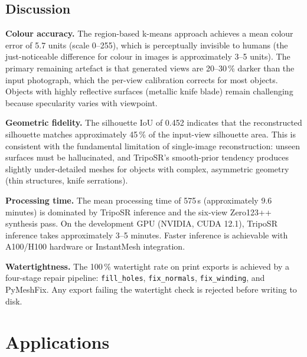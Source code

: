 ﻿\documentclass[conference]{IEEEtran}
\begin{document}
\subsection{Discussion}

\textbf{Colour accuracy.}
The region-based k-means approach achieves a mean colour error of 5.7 units (scale 0--255), which is perceptually
invisible to humans (the just-noticeable difference for colour in images is approximately 3--5 units). The primary
remaining artefact is that generated views are 20--30\,\% darker than the input photograph, which the per-view
calibration corrects for most objects. Objects with highly reflective surfaces (metallic knife blade) remain
challenging because specularity varies with viewpoint.

\textbf{Geometric fidelity.}
The silhouette IoU of 0.452 indicates that the reconstructed silhouette matches approximately 45\,\% of the
input-view silhouette area. This is consistent with the fundamental limitation of single-image reconstruction:
unseen surfaces must be hallucinated, and TripoSR's smooth-prior tendency produces slightly under-detailed
meshes for objects with complex, asymmetric geometry (thin structures, knife serrations).

\textbf{Processing time.}
The mean processing time of 575\,s (approximately 9.6 minutes) is dominated by TripoSR inference and the
six-view Zero123++ synthesis pass. On the development GPU (NVIDIA, CUDA 12.1), TripoSR inference takes
approximately 3--5 minutes. Faster inference is achievable with A100/H100 hardware or InstantMesh integration.

\textbf{Watertightness.}
The 100\,\% watertight rate on print exports is achieved by a four-stage repair pipeline: \texttt{fill\_holes},
\texttt{fix\_normals}, \texttt{fix\_winding}, and PyMeshFix. Any export failing the watertight check is rejected
before writing to disk.

\section{Applications}
\end{document}
